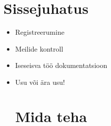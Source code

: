 \documentclass[12pt]{article}
\begin{document}
\maketitle

\section{Sissejuhatus}

\begin{itemize}

\item Registreerumine
\item Meilide kontroll
\item Iseseisva töö dokumentatsioon
\item Usu või ära usu!

\section{Mida teha}



\end{itemize}
\end{document}

